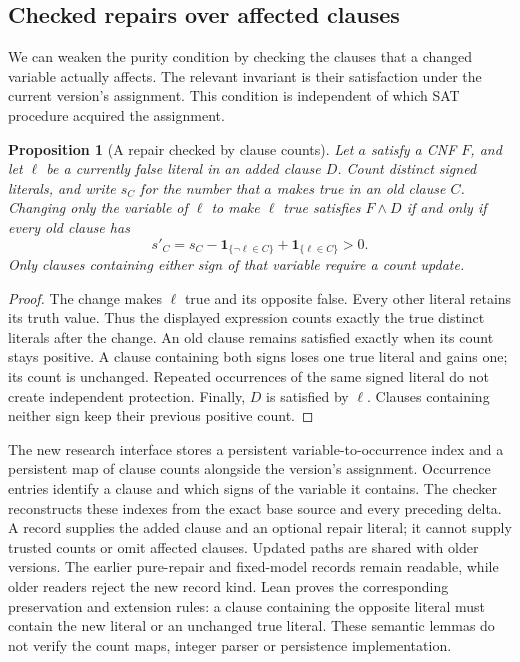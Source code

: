 \documentclass[11pt,a4paper]{article}
\numberwithin{equation}{section}
\theoremstyle{plain}
\newtheorem{proposition}[lemma]{Proposition}
\theoremstyle{definition}
\theoremstyle{remark}
\begin{document}
\subsection{Checked repairs over affected clauses}
\label{sec:affected-repair}

We can weaken the purity condition by checking the clauses that a changed variable actually affects. The relevant invariant is their satisfaction under the current version's assignment. This condition is independent of which SAT procedure acquired the assignment.

\begin{proposition}[A repair checked by clause counts]
\label{prop:affected-repair}
Let $a$ satisfy a CNF $F$, and let $\ell$ be a currently false literal in an added clause $D$. Count distinct signed literals, and write $s_C$ for the number that $a$ makes true in an old clause $C$. Changing only the variable of $\ell$ to make $\ell$ true satisfies $F\land D$ if and only if every old clause has
\[
s'_C=s_C-\mathbf{1}_{\{\neg\ell\in C\}}+\mathbf{1}_{\{\ell\in C\}}>0.
\]
Only clauses containing either sign of that variable require a count update.
\end{proposition}

\begin{proof}
The change makes $\ell$ true and its opposite false. Every other literal retains its truth value. Thus the displayed expression counts exactly the true distinct literals after the change. An old clause remains satisfied exactly when its count stays positive. A clause containing both signs loses one true literal and gains one; its count is unchanged. Repeated occurrences of the same signed literal do not create independent protection. Finally, $D$ is satisfied by $\ell$. Clauses containing neither sign keep their previous positive count.
\end{proof}

The new research interface stores a persistent variable-to-occurrence index and a persistent map of clause counts alongside the version's assignment. Occurrence entries identify a clause and which signs of the variable it contains. The checker reconstructs these indexes from the exact base source and every preceding delta. A record supplies the added clause and an optional repair literal; it cannot supply trusted counts or omit affected clauses. Updated paths are shared with older versions. The earlier pure-repair and fixed-model records remain readable, while older readers reject the new record kind. Lean proves the corresponding preservation and extension rules: a clause containing the opposite literal must contain the new literal or an unchanged true literal. These semantic lemmas do not verify the count maps, integer parser or persistence implementation.
\end{document}
